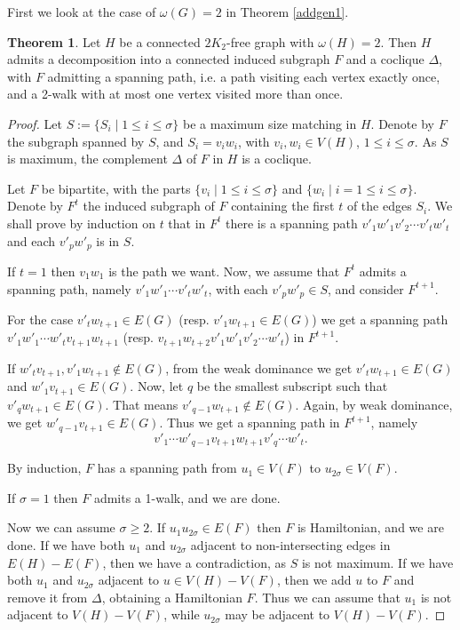 \documentclass{amsart}
\theoremstyle{definition}
\newtheorem{theorem}{Theorem}
\begin{document}
First we look at the case of  $\omega(G)=2$ in Theorem \ref{addgen1}.
\begin{theorem}\label{thm4}
Let $H$ be a connected $2K_2$-free graph with $\omega(H)=2$. 
Then $H$ admits a decomposition into a connected induced subgraph $F$ and a coclique $\Delta$, with $F$ admitting 
a spanning path, i.e. a path visiting each vertex exactly once, and 
a 2-walk with at most one vertex visited more than once.
\end{theorem}


\begin{proof}
Let $S:=\{S_i\mid 1\leq i\leq  \sigma\}$ be a maximum size matching in $H$.
Denote by $F$ the subgraph spanned by $S$, and
$S_{i}=v_{i}w_{i}$, with $v_i, w_i\in V(H)$, $1\leq i\leq \sigma$. 
As $S$ is maximum, the complement $\Delta$ of $F$ in $H$ is a coclique.

Let $F$ be bipartite, with the parts $\{v_{i}\mid 1\leq i\leq\sigma\}$ and 
$\{w_{i}\mid i=1\leq i\leq\sigma\}$. 
Denote by $F^t$ the induced subgraph of $F$ containing the first $t$ of the edges $S_i$.
We shall prove by induction on $t$ that in $F^t$ there is a spanning path $v'_{1}w'_{1}v'_{2}\cdots v'_{t}w'_{t}$ and each $v'_{p}w'_{p}$ is 
in $S$.

If $t=1$ then $v_{1}w_{1}$ is the path we want. Now, we assume that $F^t$ admits a spanning path, namely $v'_{1}w'_{1}\cdots v'_{t}w'_{t}$, 
with each $v'_{p}w'_{p}\in S$, and consider $F^{t+1}$.

For the case $v'_{t}w_{t+1}\in E(G)$ 
(resp. $v'_{1}w_{t+1}\in E(G)$)
we get a spanning path 
$v'_{1} w'_{1}\cdots w'_{t} v_{t+1} w_{t+1}$
(resp. $v_{t+1} w_{t+2} v'_{1} w'_{1} v'_{2}\cdots w'_{t}$)
in $F^{t+1}$.

If $w'_{t}v_{t+1},v'_{1}w_{t+1}\not\in E(G)$, from the weak dominance
we get $v'_{t}w_{t+1}\in E(G)$ and $w'_{1}v_{t+1}\in E(G)$. Now, let
$q$ be the smallest subscript such that $v'_{q}w_{t+1}\in E(G)$. That
means $v'_{q-1}w_{t+1}\not\in E(G)$. Again, by weak dominance,
we get $w'_{q-1}v_{t+1}\in E(G)$. Thus we get a spanning path in
$F^{t+1}$, namely $$v'_{1}\cdots
w'_{q-1}v_{t+1}w_{t+1}v'_{q}\cdots w'_{t}.$$

By induction, $F$ has a spanning path from $u_1\in V(F)$ to
$u_{2\sigma}\in V(F)$. %

If $\sigma=1$ then $F$ admits a 1-walk,
and we are done.

Now we can assume $\sigma\geq 2$.
If $u_1u_{2\sigma}\in E(F)$ then $F$ is
Hamiltonian, and we are done. 
If we have both $u_1$ and $u_{2\sigma}$ adjacent to non-intersecting edges in $E(H)-E(F)$, 
then we have a contradiction, as $S$ is not maximum.
If we have both $u_1$ and $u_{2\sigma}$ adjacent to  $u\in V(H)-V(F)$, 
then we add $u$ to $F$ and remove it from $\Delta$, obtaining
a Hamiltonian $F$.
Thus we can assume that $u_1$ is not adjacent to  $V(H)-V(F)$, 
while $u_{2\sigma}$ may be adjacent to  $V(H)-V(F)$. 



\end{proof}
\end{document}
